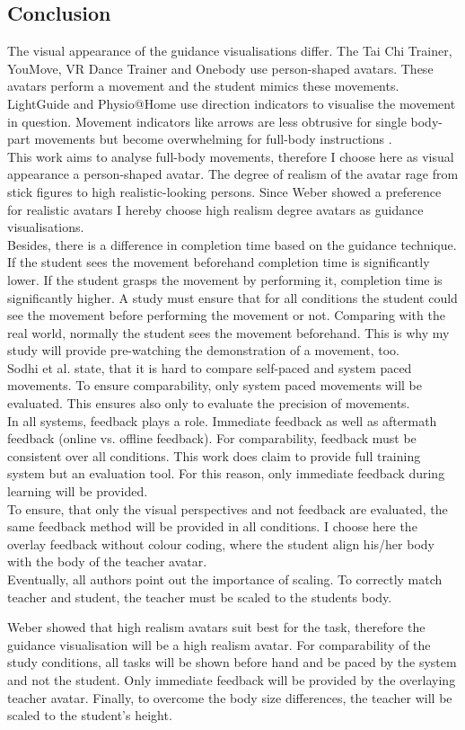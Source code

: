 \subsection{Conclusion}
The visual appearance of the guidance visualisations differ. The Tai Chi Trainer, YouMove, VR Dance Trainer and Onebody use person-shaped avatars. These avatars perform a movement and the student mimics these movements. LightGuide and Physio@Home use direction indicators to visualise the movement in question. Movement indicators like arrows are less obtrusive for single body-part movements but become overwhelming for full-body instructions \cite{Sodhi2012}.\\
This work aims to analyse full-body movements, therefore I choose here as visual appearance a person-shaped avatar. The degree of realism of the avatar rage from stick figures to high realistic-looking persons. Since Weber \cite{Weber2018} showed a preference for realistic avatars I hereby choose high realism degree avatars as guidance visualisations.\\
Besides, there is a difference in completion time based on the guidance technique. If the student sees the movement beforehand completion time is significantly lower. If the student grasps the movement by performing it, completion time is significantly higher. A study must ensure that for all conditions the student could see the movement before performing the movement or not. Comparing with the real world, normally the student sees the movement beforehand. This is why my study will provide pre-watching the demonstration of a movement, too.\\
Sodhi et al. state, that it is hard to compare self-paced and system paced movements. To ensure comparability, only system paced movements will be evaluated. This ensures also only to evaluate the precision of movements.\\
In all systems, feedback plays a role. Immediate feedback as well as aftermath feedback (online vs. offline feedback). For comparability, feedback must be consistent over all conditions. This work does claim to provide full training system but an evaluation tool. For this reason, only immediate feedback during learning will be provided.\\
To ensure, that only the visual perspectives and not feedback are evaluated, the same feedback method will be provided in all conditions. I choose here the overlay feedback without colour coding, where the student align his/her body with the body of the teacher avatar.\\
Eventually, all authors point out the importance of scaling. To correctly match teacher and student, the teacher must be scaled to the students body.
\begin{tcolorbox}[colback=red!30!white]
	Weber showed that high realism avatars suit best for the task, therefore the guidance visualisation will be a high realism avatar. For comparability of the study conditions, all tasks will be shown before hand and be paced by the system and not the student. Only immediate feedback will be provided by the overlaying teacher avatar. Finally, to overcome the body size differences, the teacher will be scaled to the student's height.
\end{tcolorbox}


